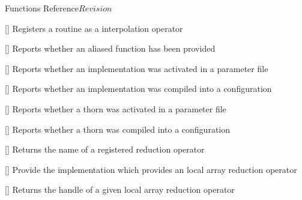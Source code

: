 \begin{cactuspart}{ Functions Reference}{}{$Revision$}
\begin{Lentry}

\item[\code{CCTK\_InterpRegisterOpLocalUniform}]
  [\pageref{CCTK-InterpRegisterOpLocalUniform}]
  Registers a routine as a 
  interpolation operator


\item[\code{CCTK\_IsFunctionAliased}]
  [\pageref{CCTK-IsFunctionAliased}]
  Reports whether an aliased function has been provided

\item[\code{CCTK\_IsImplementationActive}]
  [\pageref{CCTK-IsImplementationActive}]
  Reports whether an implementation was activated in a parameter file

\item[\code{CCTK\_IsImplementationCompiled}]
  [\pageref{CCTK-IsImplementationCompiled}]
  Reports whether an implementation was compiled into a configuration

\item[\code{CCTK\_IsThornActive}] [\pageref{CCTK-IsThornActive}]
  Reports whether a thorn was activated in a parameter file

\item[\code{CCTK\_IsThornCompiled}] [\pageref{CCTK-IsThornCompiled}]
  Reports whether a thorn was compiled into a configuration

\item[\code{CCTK\_LocalArrayReduceOperator}] [\pageref{CCTK-LocalArrayReduceOperator}]
  Returns the name of a registered reduction operator

\item[\code{CCTK\_LocalArrayReduceOperatorImplementation}] [\pageref{CCTK-LocalArrayReduceOperatorImplementation}]
  Provide the implementation which provides an local array reduction operator

\item[\code{CCTK\_LocalArrayReductionHandle}] [\pageref{CCTK-LocalArrayReductionHandle}]
  Returns the handle of a given local array reduction operator


\end{Lentry}
\end{cactuspart}
